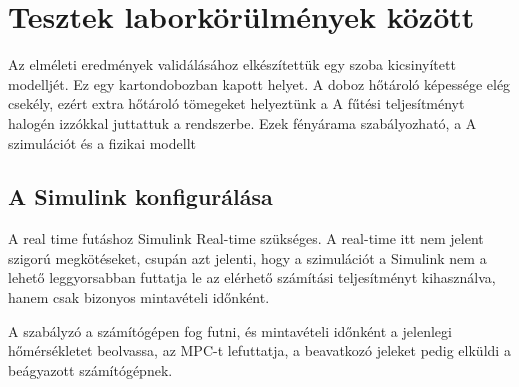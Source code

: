 \chapter{Tesztek laborkörülmények között}

Az elméleti eredmények validálásához elkészítettük egy szoba kicsinyített modelljét. Ez egy kartondobozban kapott helyet. A doboz hőtároló képessége elég csekély, ezért extra hőtároló tömegeket helyeztünk a 
A fűtési teljesítményt halogén izzókkal juttattuk a rendszerbe. Ezek fényárama szabályozható, a 
A szimulációt és a fizikai modellt

\section{A Simulink konfigurálása}
A real time futáshoz Simulink  Real-time szükséges. A real-time itt nem jelent szigorú megkötéseket, csupán azt jelenti, hogy a szimulációt a Simulink nem a lehető leggyorsabban futtatja le az elérhető számítási teljesítményt kihasználva, hanem csak bizonyos mintavételi időnként. 


A szabályzó a számítógépen fog futni, és mintavételi időnként a jelenlegi hőmérsékletet beolvassa, az MPC-t lefuttatja, a beavatkozó jeleket pedig elküldi a beágyazott számítógépnek.


